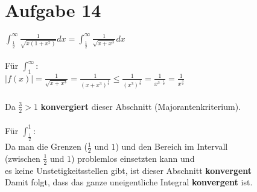 \documentclass[12pt,a4paper]{article}
\begin{document}
\section*{Aufgabe 14}
$\int_\frac{1}{2}^\infty \frac{1}{\sqrt{x(1+x^2)}}dx = \int_\frac{1}{2}^\infty \frac{1}{\sqrt{x+x^3}}dx$\\
\\
Für $\int_1^\infty$:\\
$|f(x)|=\frac{1}{\sqrt{x+x^3}} = \frac{1}{(x+x^3)^\frac{1}{2}}\leq \frac{1}{(x^3)^\frac{1}{2}}=\frac{1}{x^{3\cdot \frac{1}{2}}}= \frac{1}{x^\frac{3}{2}}$\\
\\
Da $\frac{3}{2} > 1$ \textbf{konvergiert} dieser Abschnitt (Majorantenkriterium).\\
\\
Für $\int_\frac{1}{2}^1$:\\
Da man die Grenzen ($\frac{1}{2}$ und $1$) und den Bereich im Intervall \\
(zwischen $\frac{1}{2}$ und $1$) problemlos einsetzten kann und \\ 
es keine Unstetigkeitsstellen gibt, ist dieser Abschnitt \textbf{konvergent}\\
Damit folgt, dass das ganze uneigentliche Integral \textbf{konvergent} ist.\\
\end{document}
